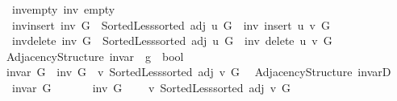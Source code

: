 \begin{isabellebody}
\ \ \ inv{\isacharunderscore}{\kern0pt}empty{\isacharcolon}{\kern0pt}\ {\isachardoublequoteopen}inv\ empty{\isachardoublequoteclose}\isanewline
\ \ \ inv{\isacharunderscore}{\kern0pt}insert{\isacharcolon}{\kern0pt}\ {\isachardoublequoteopen}inv\ G\ {\isasymand}\ Sorted{\isacharunderscore}{\kern0pt}Less{\isachardot}{\kern0pt}sorted\ {\isacharparenleft}{\kern0pt}adj\ u\ G{\isacharparenright}{\kern0pt}\ {\isasymLongrightarrow}\ inv\ {\isacharparenleft}{\kern0pt}insert\ u\ v\ G{\isacharparenright}{\kern0pt}{\isachardoublequoteclose}\isanewline
\ \ \ inv{\isacharunderscore}{\kern0pt}delete{\isacharcolon}{\kern0pt}\ {\isachardoublequoteopen}inv\ G\ {\isasymand}\ Sorted{\isacharunderscore}{\kern0pt}Less{\isachardot}{\kern0pt}sorted\ {\isacharparenleft}{\kern0pt}adj\ u\ G{\isacharparenright}{\kern0pt}\ {\isasymLongrightarrow}\ inv\ {\isacharparenleft}{\kern0pt}delete\ u\ v\ G{\isacharparenright}{\kern0pt}{\isachardoublequoteclose}\isanewline
%
\isadeliminvisible
\isanewline
%
\endisadeliminvisible
%
\isataginvisible
{}\isamarkupfalse%
\ {\isacharparenleft}{\kern0pt}\ Adjacency{\isacharunderscore}{\kern0pt}Structure{\isacharparenright}{\kern0pt}\ invar\ {\isacharcolon}{\kern0pt}{\isacharcolon}{\kern0pt}\ {\isachardoublequoteopen}{\isacharprime}{\kern0pt}g\ {\isasymRightarrow}\ bool{\isachardoublequoteclose}\ \isanewline
\ \ {\isachardoublequoteopen}invar\ G\ {\isasymequiv}\ inv\ G\ {\isasymand}\ {\isacharparenleft}{\kern0pt}{\isasymforall}v{\isachardot}{\kern0pt}\ Sorted{\isacharunderscore}{\kern0pt}Less{\isachardot}{\kern0pt}sorted\ {\isacharparenleft}{\kern0pt}adj\ v\ G{\isacharparenright}{\kern0pt}{\isacharparenright}{\kern0pt}{\isachardoublequoteclose}\isanewline
\isanewline
{}\isamarkupfalse%
\ {\isacharparenleft}{\kern0pt}\ Adjacency{\isacharunderscore}{\kern0pt}Structure{\isacharparenright}{\kern0pt}\ invarD{\isacharcolon}{\kern0pt}\isanewline
\ \ \ {\isachardoublequoteopen}invar\ G{\isachardoublequoteclose}\isanewline
\ \ \isanewline
\ \ \ \ {\isachardoublequoteopen}inv\ G{\isachardoublequoteclose}\isanewline
\ \ \ \ {\isachardoublequoteopen}{\isasymforall}v{\isachardot}{\kern0pt}\ Sorted{\isacharunderscore}{\kern0pt}Less{\isachardot}{\kern0pt}sorted\ {\isacharparenleft}{\kern0pt}adj\ v\ G{\isacharparenright}{\kern0pt}{\isachardoublequoteclose}%
\endisataginvisible
{\isafoldinvisible}%
%
\isadeliminvisible
\isanewline
%
\endisadeliminvisible
%
\isadelimproof
\ \ %
\endisadelimproof

\end{isabellebody}
